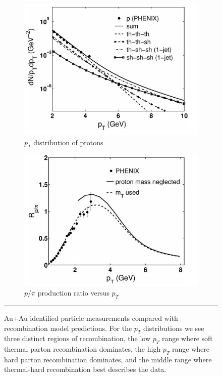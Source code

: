 \begin{figure}
\begin{subfigure}[b]{0.32\textwidth}
    \centering
    \includegraphics[width=\textwidth]{prevplots/pyieldrecomb.JPG}
    \caption{$p_T$ distribution of protons}
    \label{fig:pyieldrecomb}
\end{subfigure}
\begin{subfigure}[b]{0.5\textwidth}
    \centering
    \includegraphics[width=\textwidth]{prevplots/ppiratiorecomb.JPG}
    \caption{$p/\pi$ production ratio versus $p_T$}
    \label{fig:ppiratiorecomb}
\end{subfigure}
\rule{35em}{0.5pt}
\caption[Recombination model compared with Au+Au data]{Au+Au identified particle measurements compared with recombination model predictions. For the $p_T$ distributions we see three distinct regions of recombination, the low $p_T$ range where soft thermal parton recombination dominates, the high $p_T$ range where hard parton recombination dominates, and the middle range where thermal-hard recombination best describes the data. \citep{PhysRevC.70.024905}}
\label{fig:hwaAAmodels}    
\end{figure}

